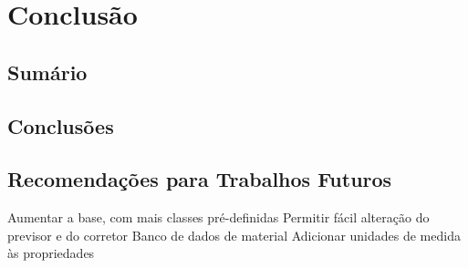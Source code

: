 \chapter{Conclusão} \label{ch:conclusion}

\section{Sumário}
\section{Conclusões}
\section{Recomendações para Trabalhos Futuros}

\alert{Aumentar a base, com mais classes pré-definidas}
\alert{Permitir fácil alteração do previsor e do corretor}
\alert{Banco de dados de material}
\alert{Adicionar unidades de medida às propriedades}
